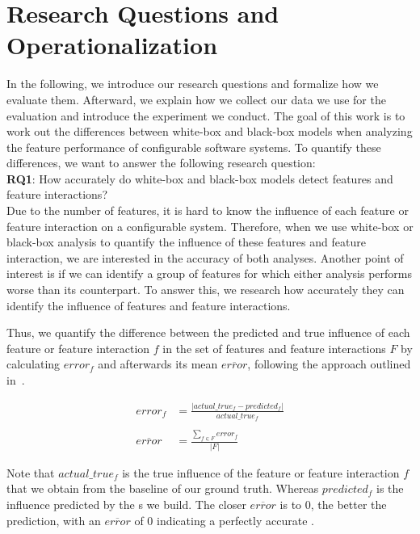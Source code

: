 \section{Research Questions and Operationalization}\label{ch:operationalization}

In the following, we introduce our research questions and formalize how we evaluate them. Afterward,
we explain how we collect our data we use for the evaluation and introduce the experiment we conduct. 
The goal of this work is to work out the differences between white-box and black-box models when analyzing the feature performance of configurable
software systems. 
To quantify these differences, we want to answer the following research question:\\

\noindent \textbf{RQ1}: How accurately do white-box and black-box models detect features and feature interactions? \\

Due to the number of features, it is hard to know the influence of each feature or feature interaction on a configurable system. 
Therefore, when we use white-box or black-box analysis to quantify the influence of these features and feature interaction, 
we are interested in the accuracy of both analyses. 
Another point of interest is if we can identify a group of features for which either analysis performs worse than its counterpart.
To answer this, we research how accurately they can identify the influence of features and feature interactions.

Thus, we quantify the difference between the predicted and true influence of each feature or feature interaction $f$ 
in the set of features and feature interactions $F$ by calculating $error_f$ and afterwards its mean $\overline{error}$, 
following the approach outlined in~\cite{mape}. %


\begin{align}
    error_f &= \frac{\lvert actual\_true_f - predicted_f \rvert}{actual\_true_f} \label{equ:APE_RQ1} \\ \nonumber \\
    \overline{error}  &= \frac{\sum_{f \in F} error_f}{\lvert F \rvert} \label{equ:MAPE_RQ1}
\end{align}

Note that $actual\_true_f$ is the true influence of the feature or feature interaction $f$ that we obtain from the baseline of our ground truth.
Whereas $predicted_f$ is the influence predicted by the {\perfInfluenceModel}s we build.
The closer $\overline{error}$ is to $0$, the better the prediction, with an $\overline{error}$ of 0 indicating a perfectly
accurate \perfInfluenceModel. 

